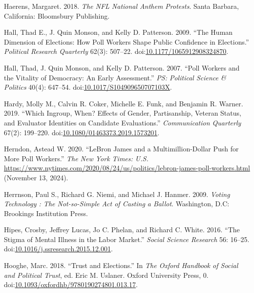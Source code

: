 \documentclass[
  12pt,
  letterpaper,
]{article}
\newlength{\cslhangindent}
\newenvironment{CSLReferences}[2] %
 {\begin{list}{}{%
  \setlength{\itemindent}{0pt}
  \setlength{\leftmargin}{0pt}
  \setlength{\parsep}{0pt}
  \ifodd #1
   \setlength{\leftmargin}{\cslhangindent}
   \setlength{\itemindent}{-1\cslhangindent}
  \fi
  \setlength{\itemsep}{#2\baselineskip}}}
 {\end{list}}
\begin{document}
\begin{CSLReferences}{1}{1}
Haerens, Margaret. 2018. \emph{The {NFL National Anthem Protests}}.
Santa Barbara, California: Bloomsbury Publishing.

Hall, Thad E., J. Quin Monson, and Kelly D. Patterson. 2009. {``The
{Human Dimension} of {Elections}: {How Poll Workers Shape Public
Confidence} in {Elections}.''} \emph{Political Research Quarterly}
62(3): 507--22.
doi:\href{https://doi.org/10.1177/1065912908324870}{10.1177/1065912908324870}.

Hall, Thad, J. Quin Monson, and Kelly D. Patterson. 2007. {``Poll
{Workers} and the {Vitality} of {Democracy}: {An Early Assessment}.''}
\emph{PS: Political Science \& Politics} 40(4): 647--54.
doi:\href{https://doi.org/10.1017/S104909650707103X}{10.1017/S104909650707103X}.

Hardy, Molly M., Calvin R. Coker, Michelle E. Funk, and Benjamin R.
Warner. 2019. {``Which Ingroup, When? {Effects} of Gender, Partisanship,
Veteran Status, and Evaluator Identities on Candidate Evaluations.''}
\emph{Communication Quarterly} 67(2): 199--220.
doi:\href{https://doi.org/10.1080/01463373.2019.1573201}{10.1080/01463373.2019.1573201}.

Herndon, Astead W. 2020. {``{LeBron James} and a {Multimillion-Dollar
Push} for {More Poll Workers}.''} \emph{The New York Times: U.S.}
\url{https://www.nytimes.com/2020/08/24/us/politics/lebron-james-poll-workers.html}
(November 13, 2024).

Herrnson, Paul S., Richard G. Niemi, and Michael J. Hanmer. 2009.
\emph{Voting Technology : The Not-so-Simple Act of Casting a Ballot}.
Washington, D.C: Brookings Institution Press.

Hipes, Crosby, Jeffrey Lucas, Jo C. Phelan, and Richard C. White. 2016.
{``The Stigma of Mental Illness in the Labor Market.''} \emph{Social
Science Research} 56: 16--25.
doi:\href{https://doi.org/10.1016/j.ssresearch.2015.12.001}{10.1016/j.ssresearch.2015.12.001}.

Hooghe, Marc. 2018. {``Trust and {Elections}.''} In \emph{The {Oxford
Handbook} of {Social} and {Political Trust}}, ed. Eric M. Uslaner.
Oxford University Press, 0.
doi:\href{https://doi.org/10.1093/oxfordhb/9780190274801.013.17}{10.1093/oxfordhb/9780190274801.013.17}.


\end{CSLReferences}
\end{document}

